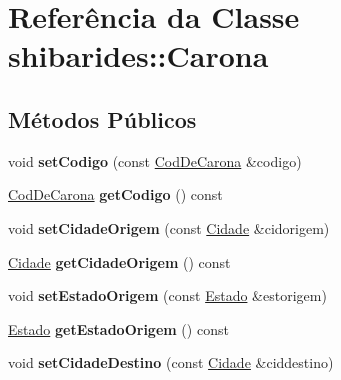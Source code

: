 \hypertarget{classshibarides_1_1Carona}{}\section{Referência da Classe shibarides\+:\+:Carona}
\label{classshibarides_1_1Carona}
\subsection*{Métodos Públicos}
\begin{DoxyCompactItemize}
\item 
void {\bfseries set\+Codigo} (const \hyperlink{classshibarides_1_1CodDeCarona}{Cod\+De\+Carona} \&codigo)\hypertarget{classshibarides_1_1Carona_a4c92ff9279cf52a428b8ff25e6a132db}{}\label{classshibarides_1_1Carona_a4c92ff9279cf52a428b8ff25e6a132db}

\item 
\hyperlink{classshibarides_1_1CodDeCarona}{Cod\+De\+Carona} {\bfseries get\+Codigo} () const \hypertarget{classshibarides_1_1Carona_aaf5471db61f27b78a13798003f12439c}{}\label{classshibarides_1_1Carona_aaf5471db61f27b78a13798003f12439c}

\item 
void {\bfseries set\+Cidade\+Origem} (const \hyperlink{classshibarides_1_1Cidade}{Cidade} \&cidorigem)\hypertarget{classshibarides_1_1Carona_a4a47c7f3210c4e9c2d4c380bd6c66682}{}\label{classshibarides_1_1Carona_a4a47c7f3210c4e9c2d4c380bd6c66682}

\item 
\hyperlink{classshibarides_1_1Cidade}{Cidade} {\bfseries get\+Cidade\+Origem} () const \hypertarget{classshibarides_1_1Carona_a01e2983cc1cf3cb30b550d8a38a7a8e1}{}\label{classshibarides_1_1Carona_a01e2983cc1cf3cb30b550d8a38a7a8e1}

\item 
void {\bfseries set\+Estado\+Origem} (const \hyperlink{classshibarides_1_1Estado}{Estado} \&estorigem)\hypertarget{classshibarides_1_1Carona_a72879cb0fe8fa20c740a3069e835571a}{}\label{classshibarides_1_1Carona_a72879cb0fe8fa20c740a3069e835571a}

\item 
\hyperlink{classshibarides_1_1Estado}{Estado} {\bfseries get\+Estado\+Origem} () const \hypertarget{classshibarides_1_1Carona_a27959baa3fab1df9ebabd62aaa2865a1}{}\label{classshibarides_1_1Carona_a27959baa3fab1df9ebabd62aaa2865a1}

\item 
void {\bfseries set\+Cidade\+Destino} (const \hyperlink{classshibarides_1_1Cidade}{Cidade} \&ciddestino)\hypertarget{classshibarides_1_1Carona_a679af6917e6369980427717f986b139a}{}\label{classshibarides_1_1Carona_a679af6917e6369980427717f986b139a}


\end{DoxyCompactItemize}
